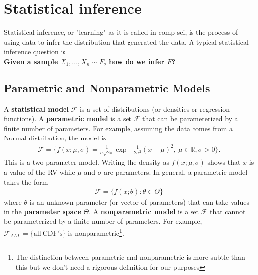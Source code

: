 \section{Statistical inference}

Statistical inference, or "learning" as it is called in comp sci, is the process of using data to infer the distribution that generated the data. A typical statistical inference question is \\

\textbf{Given a sample $X_1,...,X_n \sim F$, how do we infer $F$?}

\subsection{Parametric and Nonparametric Models}

A \textbf{statistical model} $\mathscr{F}$ is a set of distributions (or densities or regression functions). A \textbf{parametric model} is a set $\mathscr{F}$ that can be parameterized by a finite number of parameters. For example, assuming the data comes from a Normal distribution, the model is
\begin{align*}
    \mathscr{F} = \{f(x;\mu,\sigma) = \frac{1}{\sigma\sqrt{2\pi}} \exp{-\frac{1}{2\sigma^2}(x - \mu)^2},\ \mu \in \mathds{R}, \sigma > 0\}.
\end{align*}
This is a two-parameter model. Writing the density as $f(x;\mu,\sigma)$ shows that $x$ is a value of the RV while $\mu$ and $\sigma$ are parameters. In general, a parametric model takes the form
\begin{align*}
    \mathscr{F} = \{f(x;\theta):\theta \in \Theta\}
\end{align*}
where $\theta$ is an unknown parameter (or vector of parameters) that can take values in the \textbf{parameter space} $\Theta$. A \textbf{nonparametric model} is a set $\mathscr{F}$ that cannot be parameterized by a finite number of parameters. For example, $\mathscr{F}_{ALL} = \{\mathrm{all\ CDF's}\}$ is nonparametric\footnote{The distinction between parametric and nonparametric is more subtle than this but we don’t need a rigorous definition for our purposes}.

